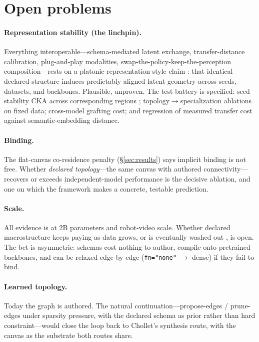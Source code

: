 \documentclass[10pt,twocolumn]{article}
\newcommand{\code}[1]{\texttt{\small #1}}
\begin{document}
\section{Open problems}
\label{sec:open}

\paragraph{Representation stability (the linchpin).} Everything interoperable---schema-mediated latent exchange, transfer-distance calibration, plug-and-play modalities, swap-the-policy-keep-the-perception composition---rests on a platonic-representation-style claim \cite{huh2024platonic}: that identical declared structure induces predictably aligned latent geometry across seeds, datasets, and backbones. Plausible, unproven. The test battery is specified: seed-stability CKA across corresponding regions \cite{kornblith2019cka}; topology$\rightarrow$specialization ablations on fixed data; cross-model grafting cost; and regression of measured transfer cost against semantic-embedding distance.

\paragraph{Binding.} The flat-canvas co-residence penalty (\S\ref{sec:results}) says implicit binding is not free. Whether \emph{declared topology}---the same canvas with authored connectivity---recovers or exceeds independent-model performance is the decisive ablation, and one on which the framework makes a concrete, testable prediction.

\paragraph{Scale.} All evidence is at 2B parameters and robot-video scale. Whether declared macrostructure keeps paying as data grows, or is eventually washed out \cite{sutton2019bitter,kaplan2020scaling}, is open. The bet is asymmetric: schemas cost nothing to author, compile onto pretrained backbones, and can be relaxed edge-by-edge (\code{fn="none"} $\rightarrow$ dense) if they fail to bind.

\paragraph{Learned topology.} Today the graph is authored. The natural continuation---propose-edges / prune-edges under sparsity pressure, with the declared schema as prior rather than hard constraint---would close the loop back to Chollet's synthesis route, with the canvas as the substrate both routes share.
\end{document}
